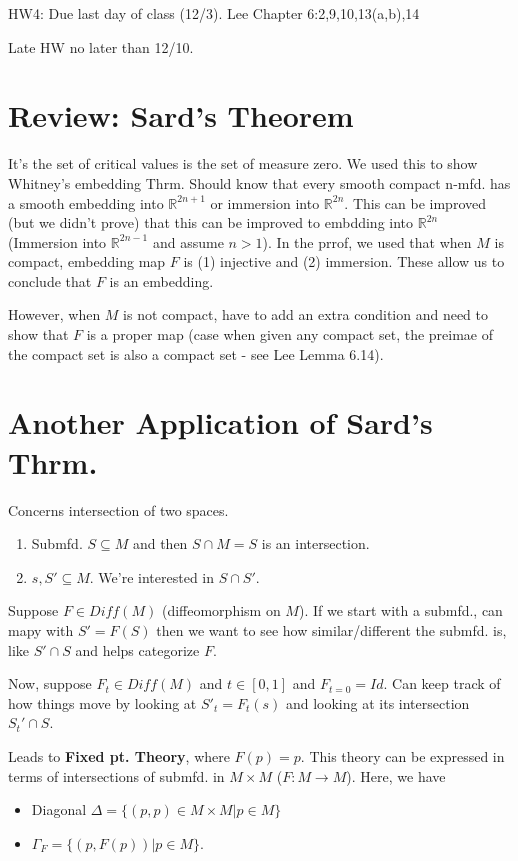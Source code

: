\documentclass[12pt,letterpaper]{article}
\begin{document}
HW4: Due last day of class (12/3). Lee Chapter 6:2,9,10,13(a,b),14

Late HW no later than 12/10.

\section*{Review: Sard's Theorem}

It's the set of critical values is the set of measure zero. We used this to show Whitney's embedding Thrm. Should know that every smooth compact n-mfd. has a smooth embedding into $\mathbb{R}^{2n+1}$  or immersion into $\mathbb{R}^{2n}$. This can be improved (but we didn't prove) that this can be improved to embdding into $\mathbb{R}^{2n}$ (Immersion into $\mathbb{R}^{2n-1}$ and assume $n>1$). In the prrof, we used that when $M$ is compact, embedding map $F$ is (1) injective and (2) immersion. These allow us to conclude that $F$ is an embedding. 

However, when $M$ is not compact, have to add an extra condition and need to show that $F$ is a proper map (case when given any compact set, the preimae of the compact set is also a compact set - see Lee Lemma 6.14). 

\section{Another Application of Sard's Thrm.}

Concerns intersection of two spaces.
\begin{enumerate}
    \item Submfd. $S \subseteq M$ and then $S \cap M = S$ is an intersection.
    \item $s, S' \subseteq M$. We're interested in $S \cap S'$.
\end{enumerate}

Suppose $F \in Diff(M)$ (diffeomorphism on $M$). If we start with a submfd., can mapy with $S' = F(S)$ then we want to see how similar/different the submfd. is, like $S' \cap S$ and helps categorize $F$. 

Now, suppose $F_t \in Diff(M)$ and $t\in [0,1]$ and $F_{t=0} = Id$. Can keep track of how things move by looking at $S'_t = F_t(s)$ and looking at its intersection $S_t' \cap S$. 

Leads to \textbf{Fixed pt. Theory}, where $F(p)=p$. This theory can be expressed in terms of intersections of submfd. in $M \times M$  ($F: M \rightarrow M$).  Here, we have
\begin{itemize}
    \item Diagonal $\Delta = \{ (p,p) \in M\times M | p \in M\}$
    \item $\Gamma_F = \{ (p, F(p))| p \in M\}$.
\end{itemize}
\end{document}

